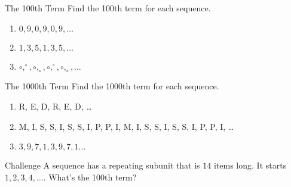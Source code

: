 \documentclass[12pt,letterpaper]{article}
\begin{document}
\begin{problem}{The 100th Term}
Find the 100th term for each sequence.

\begin{enumerate}[\hspace{.5cm}a.]
\item $0, 9, 0, 9, 0, 9, \ldots$
\item $1, 3, 5, 1, 3, 5, \ldots$
\item $\circ, ^\circ, \circ, _\circ, \circ, ^\circ, \circ, _\circ, \ldots$
\end{enumerate}
\end{problem}

\begin{problem}{The 1000th Term}
Find the 1000th term for each sequence.

\begin{enumerate}[\hspace{.5cm}a.]
\item R, E, D, R, E, D, \ldots
\item M, I, S, S, I, S, S, I, P, P, I, M, I, S, S, I, S, S, I, P, P, I, \ldots
\item $3, 9, 7, 1, 3, 9, 7, 1 \ldots$
\end{enumerate}
\end{problem}

\begin{problem}{Challenge}
A sequence has a repeating subunit that is $14$ items long. It starts $1, 2, 3,
4, \ldots$. What's the 100th term?
\end{problem}
\end{document}
